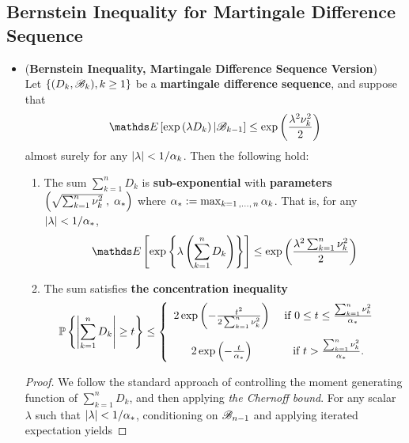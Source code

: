 \documentclass[11pt]{article}
\begin{document}
\subsection{Bernstein Inequality for Martingale Difference Sequence}
\begin{itemize}
\item \begin{proposition} (\textbf{Bernstein Inequality, Martingale Difference Sequence Version}) \citep{wainwright2019high}\\
Let $\left\{(D_k, {\mathscr B}_k), k \ge 1\right\}$ be a \textbf{martingale difference sequence}, and suppose that 
\begin{align*}
\E{}{\exp\paren{\lambda D_k} | \srB_{k-1}} \le \exp\paren{\frac{\lambda^2 \nu_k^2}{2} }
\end{align*} almost surely for any $\left\lvert \lambda \right\rvert < 1/\alpha_k$. Then the following hold:
\begin{enumerate}
\item The sum $\sum_{k=1}^{n}D_k$ is \textbf{sub-exponential} with \textbf{parameters} $\left(\sqrt{\sum_{k=1}^{n}\nu_k^2}\;  , \;\alpha_{*}\right)$ where $\alpha_{*} := \max_{k=1 \,{,}\ldots{,}\, n} \alpha_k$. That is, for any $\left\lvert \lambda \right\rvert < 1/\alpha_{*}$, 
\begin{align*}
\E{}{\exp\set{\lambda \paren{\sum_{k=1}^{n}D_k}}} \le \exp\paren{\frac{\lambda^2\sum_{k=1}^{n}\nu_k^2}{2} }
\end{align*}
\item The sum satisfies \textbf{the concentration inequality}
\begin{align}
{\mathbb P}\left\{\left\lvert \sum_{k=1}^{n}D_k \right\rvert \ge t \right\} &\le \left\{ \begin{array}{cc}
2 \exp\left(- \frac{t^2}{2 \sum_{k=1}^{n}\nu_k^2}\right) & \text{ if } 0 \le t \le \frac{\sum_{k=1}^{n}\nu_k^2}{\alpha_{*}} \\[15pt]
2 \exp\left(- \frac{t}{\alpha_{*}}\right) &\text{ if } t > \frac{\sum_{k=1}^{n}\nu_k^2}{\alpha_{*}}.
\end{array}\right. \label{ineqn: bernstein_inequality_martingale}
\end{align}
\end{enumerate}
\end{proposition}
\begin{proof}
We follow the standard approach of controlling the moment generating function of $\sum_{k=1}^{n}D_k$, and then applying \emph{the Chernoff bound}. For any scalar $\lambda$ such that $\left\lvert \lambda \right\rvert < 1/\alpha_{*}$, conditioning on ${\mathscr B}_{n-1}$ and applying iterated expectation yields

\end{proof}
\end{itemize}
\end{document}
